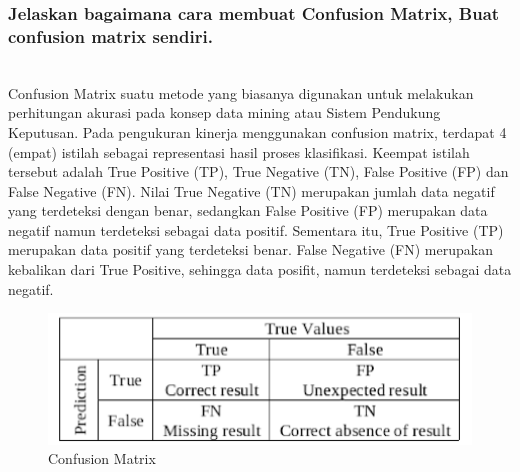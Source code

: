\subsubsection{Jelaskan bagaimana cara membuat Confusion Matrix, Buat confusion matrix sendiri.}
\hfill\\
Confusion Matrix suatu metode yang biasanya digunakan untuk melakukan perhitungan akurasi pada konsep data mining atau Sistem Pendukung Keputusan. Pada pengukuran kinerja menggunakan confusion matrix, terdapat 4 (empat) istilah sebagai representasi hasil proses klasifikasi. Keempat istilah tersebut adalah True Positive (TP), True Negative (TN), False Positive (FP) dan False Negative (FN). Nilai True Negative (TN) merupakan jumlah data negatif yang terdeteksi dengan benar, sedangkan False Positive (FP) merupakan data negatif namun terdeteksi sebagai data positif. Sementara itu, True Positive (TP) merupakan data positif yang terdeteksi benar. False Negative (FN) merupakan kebalikan dari True Positive, sehingga data posifit, namun terdeteksi sebagai data negatif.

\begin{figure}[H]
    \includegraphics[width=12cm]{figures/1174087/2/cm.png}
    \centering
    \caption{Confusion Matrix}
\end{figure}	

